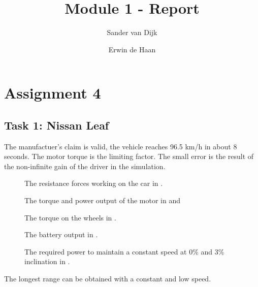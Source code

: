 \documentclass[final]{scrreprt} %
\title{Module 1 - Report}
\author{Sander {van Dijk} \and Erwin {de Haan}}
\begin{document}
\chapter{Assignment 4}
\section{Task 1: Nissan Leaf}
The manufactuer's claim is valid, the vehicle reaches 96.5 km/h in about 8 seconds.
The motor torque is the limiting factor.
The small error is the result of the non-infinite gain of the driver in the simulation.
\begin{figure}[H]
	\centering
    	\setlength\figureheight{4cm}
    	\setlength{}
    	
    	\label{fig:resistance-forces}
    	\caption{The resistance forces working on the car in \newton.}
\end{figure}
\begin{figure}[H]
	\centering
    	\setlength\figureheight{4cm}
    	\setlength{}
    	
    	\label{fig:motor-torque-power}
    	\caption{The torque and power output of the motor in \newton\meter and \watt}
\end{figure}
\begin{figure}[H]
	\centering
    	\setlength\figureheight{4cm}
    	\setlength{}
    	
    	\label{fig:wheel-torque}
    	\caption{The torque on the wheels in \newton\meter.}
\end{figure}
\begin{figure}[H]
	\centering
    	\setlength\figureheight{4cm}
    	\setlength{}
    	
    	\label{fig:wheel-torque}
    	\caption{The battery output in \watt.}
\end{figure}

\begin{figure}[H]
	\centering
    	\setlength\figureheight{4cm}
    	\setlength{}
    	
    	\label{fig:power-req}
    	\caption{The required power to maintain a constant speed at 0\% and 3\% inclination in \watt.}
\end{figure}
The longest range can be obtained with a constant and low speed.
\end{document}
